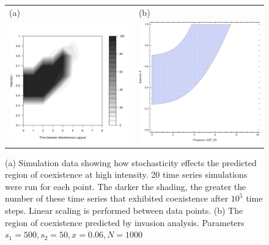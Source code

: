 \begin{figure}\begin{tabular}{ll}
(a)&(b)\\
 \includegraphics[width=2.5in]{simcoexist.pdf}& \includegraphics[width=2.5in]{hockeyTd.pdf}\end{tabular}
   \caption[Comparing simulation data with analytical predictions]{(a) Simulation data showing how stochasticity effects the predicted region of coexistence at high intensity. 20 time series simulations were run for each point. The darker the shading, the greater the number of these time series that exhibited coexistence after $10^5$ time steps. Linear scaling is performed between data points. (b) The region of coexistence predicted by invasion analysis. Parameters $s_1=500,s_2=50,x=0.06,N=1000$}
 \label{fig:simulationdata}
\end{figure}

